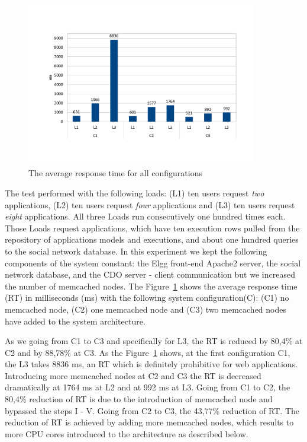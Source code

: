 \begin{figure}[h]
	\centering
	\includegraphics[width=0.9\textwidth,natwidth=200,natheight=150]{./fig/RTavg.pdf}
	\caption{The average response time for all configurations}
	\label{fig:rtavg}
\end{figure}

The test performed with the following loads: (L1) ten users request \emph{two} applications, (L2) ten users request \emph{four} applications and (L3) ten users request \emph{eight} applications. All three Loads run consecutively one hundred times each. Those Loads request applications, which have ten execution rows pulled from the repository of applications models and executions, and about one hundred queries to the social network database. In this experiment we kept the following components of the system constant: the Elgg front-end Apache2 server, the social network database, and the CDO server - client communication but we increased the number of memcached nodes.
The Figure~\ref{fig:rtavg} shows the  average response time (RT) in milliseconds (ms) with the following system configuration(C): (C1) no memcached node, (C2) one memcached node and (C3) two memcached nodes have added to the system architecture.

As we going from C1 to C3 and specifically for L3, the RT is reduced by 80,4\% at C2 and by 88,78\% at C3. As the Figure~\ref{fig:rtavg} shows, at the first configuration C1, the L3 takes 8836 ms, an RT which is definitely prohibitive for web applications. Introducing more memcached nodes at C2 and C3 the RT is decreased dramatically at 1764 ms at L2 and at 992 ms at L3. Going from C1 to C2, the 80,4\% reduction of RT is due to the introduction of memcached node and bypassed the steps I - V. Going from C2 to C3, the 43,77\% reduction of RT. The reduction of RT is achieved by adding more memcached nodes, which results to more CPU cores introduced to the architecture as described below.

